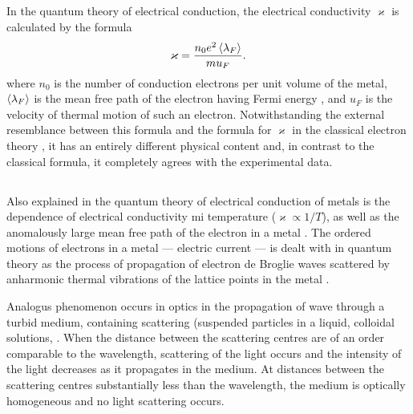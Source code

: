 \subsection{}\label{41.5.2} In the quantum theory of electrical conduction, the electrical conductivity $\varkappa $ is calculated by the formula
\begin{equation*}%
\varkappa  = \frac{n_{0}e^{2} \expval{\lambda_{F}}}{m u_{F}}.
\end{equation*}
where $n_{0}$ is the number of conduction electrons per unit volume of the metal, $\expval{\lambda_{F}}$ is the mean free path of the electron  having Fermi energy , and $u_{F}$ is the velocity of thermal motion of such an electron. Notwithstanding the external resemblance
between this formula and the formula for $\varkappa$ in the
classical electron theory , it has an entirely different physical content and, in contrast to the classical formula, it completely agrees with the experimental data.

\subsection{}\label{41.5.3} Also explained in the quantum theory of electrical conduction of metals is the dependence of electrical conductivity mi temperature ($\varkappa \propto 1/T$), as well as the anomalously large mean free path of the electron in a metal . The ordered motions of electrons in a metal --- electric current --- is dealt with
in quantum theory as the process of propagation of electron
de Broglie waves  scattered by anharmonic thermal vibrations of the lattice points in the metal . 

Analogus phenomenon occurs in optics in the propagation of
wave through a turbid medium, containing scattering (suspended particles in a liquid, colloidal solutions,
 . When the distance between the scattering centres are of an order comparable to the wavelength, scattering of the light occurs and the intensity of the light decreases as it propagates in the medium. At distances between the scattering centres substantially less than the wavelength, the medium is optically homogeneous and no light scattering occurs.

